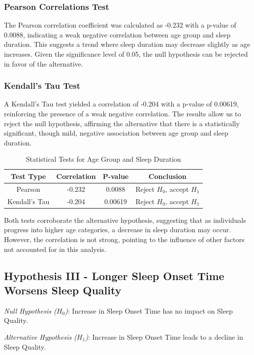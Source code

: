 \documentclass[conference]{IEEEtran}
\begin{document}
\subsubsection*{Pearson Correlations Test}
The Pearson correlation coefficient was calculated as -0.232 with a p-value of 0.0088, indicating a weak negative correlation between age group and sleep duration. This suggests a trend where sleep duration may decrease slightly as age increases. Given the significance level of 0.05, the null hypothesis can be rejected in favor of the alternative.

\subsubsection*{Kendall’s Tau Test}
A Kendall’s Tau test yielded a correlation of -0.204 with a p-value of 0.00619, reinforcing the presence of a weak negative correlation. The results allow us to reject the null hypothesis, affirming the alternative that there is a statistically significant, though mild, negative association between age group and sleep duration.

\begin{table}[ht]
\centering
\caption{Statistical Tests for Age Group and Sleep Duration}
\label{tab:hypothesis2}
\begin{tabular}{|c|c|c|c|}
\hline
\textbf{Test Type} & \textbf{Correlation} & \textbf{P-value} & \textbf{Conclusion} \\
\hline
Pearson & -0.232 & 0.0088 & Reject \(H_0\), accept \(H_1\) \\
\hline
Kendall’s Tau & -0.204 & 0.00619 & Reject \(H_0\), accept \(H_1\) \\
\hline
\end{tabular}
\end{table}

Both tests corroborate the alternative hypothesis, suggesting that as individuals progress into higher age categories, a decrease in sleep duration may occur. However, the correlation is not strong, pointing to the influence of other factors not accounted for in this analysis.


\subsection*{Hypothesis III - Longer Sleep Onset Time Worsens Sleep Quality}
\textit{Null Hypothesis (\(H_0\))}: Increase in Sleep Onset Time has no impact on Sleep Quality.

\textit{Alternative Hypothesis (\(H_1\))}: Increase in Sleep Onset Time leads to a decline in Sleep Quality.
\end{document}
